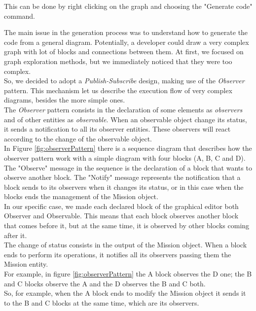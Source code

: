 This can be done by right clicking on the graph and choosing the "Generate code" command.

The main issue in the generation process was to understand how to generate the code from a general diagram. 
Potentially, a developer could draw a very complex graph with lot of blocks and connections between them.
At first, we focused on graph exploration methods, but we immediately noticed that they were too complex.
\\

So, we decided to adopt a \textit{Publish-Subscribe} design, making use of the \textit{Observer} pattern. This mechanism let us describe the execution flow of very complex diagrams, besides the more simple ones.
\\
 
The \textit{Observer} pattern consists in the declaration of some elements as \textit{observers} and of other entities as \textit{observable}. 
When an observable object change its status, it sends a notification to all its observer entities. 
These observers will react according to the change of the observable object.
\\

In Figure \ref{fig:observerPattern} there is a sequence diagram that describes how the observer pattern work with a simple diagram with four blocks (A, B, C and D).
\\
The "Observe" message in the sequence is the declaration of a block that wants to observe another block. The "Notify" message represents the notification that a block sends to its observers when it changes its status, or in this case when the blocks ends the management of the Mission object.
\\


In our specific case, we made each declared block of the graphical editor both Observer and Observable. 
This means that each block observes another block that comes before it, but at the same time, it is observed by other blocks coming after it.
\\
The change of status consists in the output of the Mission object.
When a block ends to perform its operations, it notifies all its observers passing them the Mission entity.
\\
For example, in figure \ref{fig:observerPattern} the A block observes the D one; the B and C blocks observe the A and the D observes the B and C both.
\\
So, for example, when the A block ends to modify the Mission object it sends it to the B and C blocks at the same time, which are its observers.
\\

